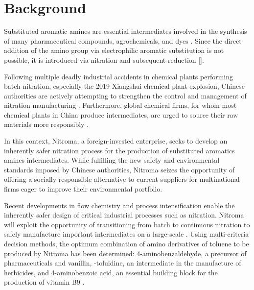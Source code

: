 \section*{Background}

Substituted aromatic amines are essential intermediates involved in the synthesis of many pharmaceutical compounds, agrochemicals, and dyes \cite{vogt_amines_2000}. Since the direct addition of the amino group via electrophilic aromatic substitution is not possible, it is introduced via nitration and subsequent reduction []. 

Following multiple deadly industrial accidents in chemical plants performing batch nitration, especially the 2019 Xiangshui chemical plant explosion, Chinese authorities are actively attempting to strengthen the control and management of nitration manufacturing \cite{el_diario_china_2019}. Furthermore, global chemical firms, for whom most chemical plants in China produce intermediates, are urged to source their raw materials more responsibly \cite{stanway_global_2019}.


In this context, Nitroma, a foreign-invested enterprise, seeks to develop an inherently safer nitration process for the production of substituted aromatics amines intermediates. While fulfilling the new safety and environmental standards imposed by Chinese authorities, Nitroma seizes the opportunity of offering a socially responsible alternative to current suppliers for multinational firms eager to improve their environmental portfolio. 

Recent developments in flow chemistry and process intensification enable the inherently safer design of critical industrial processes such as nitration. Nitroma will exploit the opportunity of transitioning from batch to continuous nitration to safely manufacture important intermediates on a large-scale \cite{di_miceli_raimondi_safety_2015}. Using multi-criteria decision methods, the optimum combination of amino derivatives of toluene to be produced by Nitroma has been determined: 4-aminobenzaldehyde, a precursor of pharmaceuticals and vanillin, \ortho-toluidine, an intermediate in the manufacture of herbicides, and 4-aminobenzoic acid, an essential building block for the production of vitamin B9 \cite{bowers_toluidines_2000,bruhne_benzaldehyde_2011,maki_benzoic_2000}.

